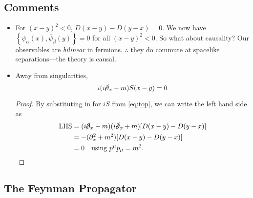 \subsection*{Comments}%

\begin{itemize}
  \item For $(x - y)^2 < 0$, $D(x - y) - D(y - x) = 0$.
    We now have $\left\{ \psi_{\alpha}(x), \overline{\psi}_{\beta} (y) \right\} = 0$ for all $(x - y)^2  < 0$.
    So what about causality?
    Our observables are \emph{bilinear} in fermions. $\therefore$ they do commute at spacelike separations---the theory is causal.
  \item Away from singularities,
     \begin{equation}
       i(i \cancel{\partial}_x - m) S(x - y) = 0
    \end{equation}
    \begin{proof}
      By substituting in for $iS$ from \eqref{eq:top}, we can write the left hand side as
      \begin{align}
	\text{LHS} &= (i \cancel{\partial}_x - m) (i \cancel{\partial}_x + m) [D (x - y) - D(y - x)] \\
		   &= - (\partial^2_x + m^2) [D(x - y) - D(y - x)] \\
		   &= 0 \quad \text{using } p^{\mu} p_{\mu} = m^2.
      \end{align}
    \end{proof}
\end{itemize}

\subsection{The Feynman Propagator}%
\label{sub:the_feynman_propagator}

